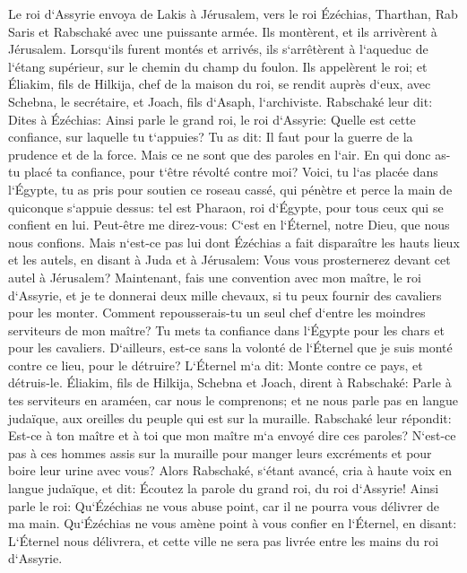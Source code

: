 \verse Le roi d`Assyrie envoya de Lakis à Jérusalem, vers le roi Ézéchias, Tharthan, Rab Saris et Rabschaké avec une puissante armée. Ils montèrent, et ils arrivèrent à Jérusalem. Lorsqu`ils furent montés et arrivés, ils s`arrêtèrent à l`aqueduc de l`étang supérieur, sur le chemin du champ du foulon. 
\verse Ils appelèrent le roi; et Éliakim, fils de Hilkija, chef de la maison du roi, se rendit auprès d`eux, avec Schebna, le secrétaire, et Joach, fils d`Asaph, l`archiviste. 
\verse Rabschaké leur dit: Dites à Ézéchias: Ainsi parle le grand roi, le roi d`Assyrie: Quelle est cette confiance, sur laquelle tu t`appuies? 
\verse Tu as dit: Il faut pour la guerre de la prudence et de la force. Mais ce ne sont que des paroles en l`air. En qui donc as-tu placé ta confiance, pour t`être révolté contre moi? 
\verse Voici, tu l`as placée dans l`Égypte, tu as pris pour soutien ce roseau cassé, qui pénètre et perce la main de quiconque s`appuie dessus: tel est Pharaon, roi d`Égypte, pour tous ceux qui se confient en lui. 
\verse Peut-être me direz-vous: C`est en l`Éternel, notre Dieu, que nous nous confions. Mais n`est-ce pas lui dont Ézéchias a fait disparaître les hauts lieux et les autels, en disant à Juda et à Jérusalem: Vous vous prosternerez devant cet autel à Jérusalem? 
\verse Maintenant, fais une convention avec mon maître, le roi d`Assyrie, et je te donnerai deux mille chevaux, si tu peux fournir des cavaliers pour les monter. 
\verse Comment repousserais-tu un seul chef d`entre les moindres serviteurs de mon maître? Tu mets ta confiance dans l`Égypte pour les chars et pour les cavaliers. 
\verse D`ailleurs, est-ce sans la volonté de l`Éternel que je suis monté contre ce lieu, pour le détruire? L`Éternel m`a dit: Monte contre ce pays, et détruis-le. 
\verse Éliakim, fils de Hilkija, Schebna et Joach, dirent à Rabschaké: Parle à tes serviteurs en araméen, car nous le comprenons; et ne nous parle pas en langue judaïque, aux oreilles du peuple qui est sur la muraille. 
\verse Rabschaké leur répondit: Est-ce à ton maître et à toi que mon maître m`a envoyé dire ces paroles? N`est-ce pas à ces hommes assis sur la muraille pour manger leurs excréments et pour boire leur urine avec vous? 
\verse Alors Rabschaké, s`étant avancé, cria à haute voix en langue judaïque, et dit: Écoutez la parole du grand roi, du roi d`Assyrie! 
\verse Ainsi parle le roi: Qu`Ézéchias ne vous abuse point, car il ne pourra vous délivrer de ma main. 
\verse Qu`Ézéchias ne vous amène point à vous confier en l`Éternel, en disant: L`Éternel nous délivrera, et cette ville ne sera pas livrée entre les mains du roi d`Assyrie. 

